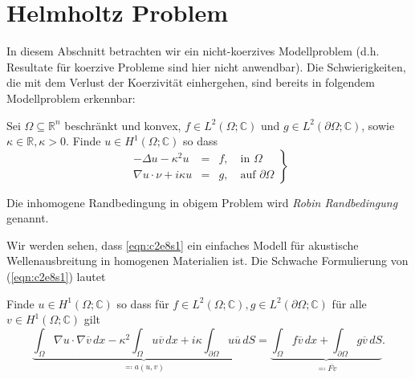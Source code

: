 \documentclass[../skript.tex]{subfiles}
\begin{document}
\section{Helmholtz Problem}\label{sec:c2e8}

In diesem Abschnitt betrachten wir ein nicht-koerzives Modellproblem (d.h. Resultate für koerzive Probleme sind hier nicht anwendbar). Die Schwierigkeiten, die mit dem Verlust der Koerzivität einhergehen, sind bereits in folgendem Modellproblem erkennbar:
\begin{problem}
	Sei $\Omega\subseteq\mathbb{R}^n$ beschränkt und konvex, $f\in L^2(\Omega;\mathbb{C})$ und $g\in L^2(\partial\Omega;\mathbb{C})$, sowie $\kappa\in\mathbb{R}, \kappa>0$. \newline\noindent
	Finde $u\in H^1(\Omega;\mathbb{C})$ so dass
	\begin{equation}\label{eqn:c2e8s1}
		\left.
		\begin{aligned}
			-\Delta u -\kappa^2 u &=& f,\quad\text{in }\Omega\\
			\nabla u\cdot\nu + i\kappa u &=& g,\quad\text{auf }\partial\Omega
		\end{aligned}
		\right\}
	\end{equation}
\end{problem}
\begin{remark}
	Die inhomogene Randbedingung in obigem Problem wird \emph{Robin Randbedingung} genannt.
\end{remark}

Wir werden sehen, dass \cref{eqn:c2e8s1} ein einfaches Modell für akustische Wellenausbreitung in homogenen Materialien ist. Die Schwache Formulierung von (\cref{eqn:c2e8s1}) lautet
\begin{problem}
	Finde $u\in H^1(\Omega;\mathbb{C})$ so dass für $f\in L^2(\Omega;\mathbb{C}), g\in L^2(\partial\Omega;\mathbb{C})$ für alle $v\in H^1(\Omega;\mathbb{C})$ gilt
	\begin{equation}\label{eqn:c2e8s2}
  			\underbrace{\int_\Omega\nabla u\cdot\nabla \overline{v}\,dx - \kappa^2\int_\Omega u\overline{v}\,dx + i\kappa\int_{\partial\Omega}u\overline{u}\,dS}_{\eqqcolon a(u,v)} = \underbrace{\int_\Omega f\overline{v}\,dx + \int_{\partial\Omega} g\overline{v}\,dS}_{\eqqcolon \overline{F{v}}}.
	\end{equation}
\end{problem}
\end{document}
